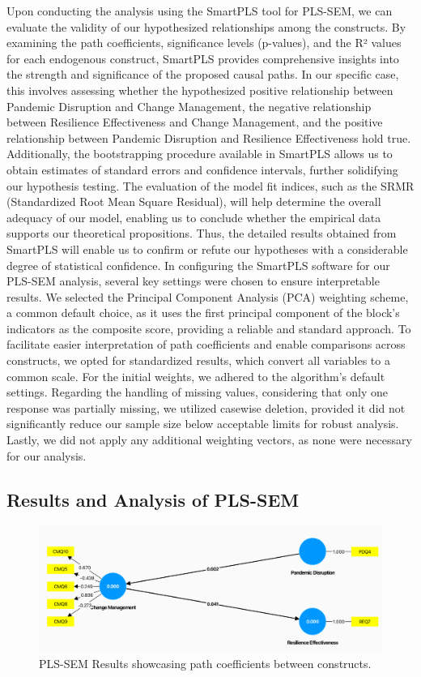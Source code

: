 Upon conducting the analysis using the SmartPLS tool for PLS-SEM, we can evaluate the validity of our hypothesized relationships among the constructs. By examining the path coefficients, significance levels (p-values), and the R² values for each endogenous construct, SmartPLS provides comprehensive insights into the strength and significance of the proposed causal paths. In our specific case, this involves assessing whether the hypothesized positive relationship between Pandemic Disruption and Change Management, the negative relationship between Resilience Effectiveness and Change Management, and the positive relationship between Pandemic Disruption and Resilience Effectiveness hold true. Additionally, the bootstrapping procedure available in SmartPLS allows us to obtain estimates of standard errors and confidence intervals, further solidifying our hypothesis testing. The evaluation of the model fit indices, such as the SRMR (Standardized Root Mean Square Residual), will help determine the overall adequacy of our model, enabling us to conclude whether the empirical data supports our theoretical propositions. Thus, the detailed results obtained from SmartPLS will enable us to confirm or refute our hypotheses with a considerable degree of statistical confidence. In configuring the SmartPLS software for our PLS-SEM analysis, several key settings were chosen to ensure interpretable results. We selected the Principal Component Analysis (PCA) weighting scheme, a common default choice, as it uses the first principal component of the block’s indicators as the composite score, providing a reliable and standard approach. To facilitate easier interpretation of path coefficients and enable comparisons across constructs, we opted for standardized results, which convert all variables to a common scale. For the initial weights, we adhered to the algorithm’s default settings. Regarding the handling of missing values, considering that only one response was partially missing, we utilized casewise deletion, provided it did not significantly reduce our sample size below acceptable limits for robust analysis. Lastly, we did not apply any additional weighting vectors, as none were necessary for our analysis.

\subsection{Results and Analysis of PLS-SEM}

\begin{figure}[h]
  \centering
  \includegraphics[width=1\textwidth]{figure/pls_sem_results_cropped.png}
  \caption{PLS-SEM Results showcasing path coefficients between constructs.}
  \label{fig:pls_sem_results}
\end{figure}

